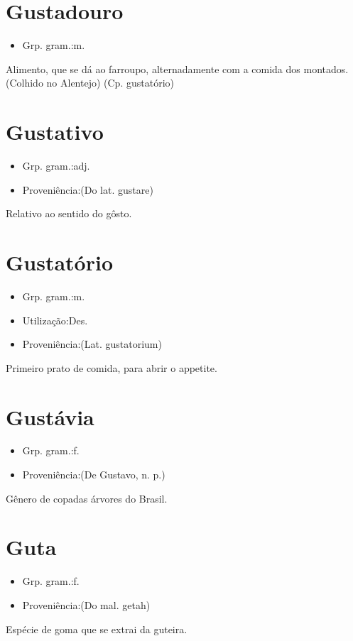 \section{Gustadouro}
\begin{itemize}
\item {Grp. gram.:m.}
\end{itemize}
Alimento, que se dá ao farroupo, alternadamente com a comida dos montados. (Colhido no Alentejo)
(Cp. \textunderscore gustatório\textunderscore )
\section{Gustativo}
\begin{itemize}
\item {Grp. gram.:adj.}
\end{itemize}
\begin{itemize}
\item {Proveniência:(Do lat. \textunderscore gustare\textunderscore )}
\end{itemize}
Relativo ao sentido do gôsto.
\section{Gustatório}
\begin{itemize}
\item {Grp. gram.:m.}
\end{itemize}
\begin{itemize}
\item {Utilização:Des.}
\end{itemize}
\begin{itemize}
\item {Proveniência:(Lat. \textunderscore gustatorium\textunderscore )}
\end{itemize}
Primeiro prato de comida, para abrir o appetite.
\section{Gustávia}
\begin{itemize}
\item {Grp. gram.:f.}
\end{itemize}
\begin{itemize}
\item {Proveniência:(De \textunderscore Gustavo\textunderscore , n. p.)}
\end{itemize}
Gênero de copadas árvores do Brasil.
\section{Guta}
\begin{itemize}
\item {Grp. gram.:f.}
\end{itemize}
\begin{itemize}
\item {Proveniência:(Do mal. \textunderscore getah\textunderscore )}
\end{itemize}
Espécie de goma que se extrai da guteira.
